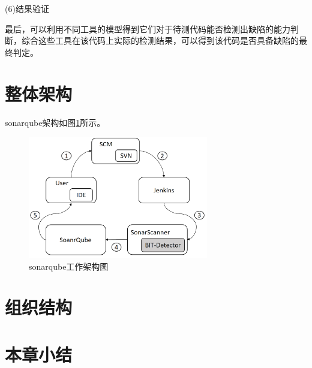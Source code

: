 (6)结果验证

最后，可以利用不同工具的模型得到它们对于待测代码能否检测出缺陷的能力判断，综合这些工具在该代码上实际的检测结果，可以得到该代码是否具备缺陷的最终判定。

\section{整体架构}
sonarqube架构如图\ref{fig:figure3-2}所示。

\begin{figure}
	\centering
	\includegraphics[width=0.70\textwidth]{figures/sonarqube3-2}
	\caption{sonarqube工作架构图}\label{fig:figure3-2}
\end{figure}

\section{组织结构}
\section{本章小结}